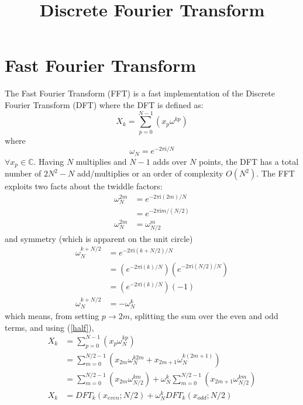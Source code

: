 \documentclass{article}
\begin{document}
%
\title{Discrete Fourier Transform}
%
\maketitle
%
\section {Fast Fourier Transform}
%
The Fast Fourier Transform (FFT) is a fast implementation of the Discrete Fourier Transform (DFT) where the DFT is defined as:
%
\begin {equation} \label {eq:dft}
X_k = \sum_{p = 0}^{N-1} (x_p \omega^{k p})
\end {equation}
%
where
%
\begin {equation} \label {eq:twiddle}
\omega_N = e^{-2 \pi \mathrm {i} / N}
\end {equation}
%
$\forall x_p \in \mathbb {C}$. Having $N$ multiplies and $N-1$ adds over $N$ points, the DFT has a total number of $2 N^2 - N$ add/multiplies or an order of complexity $O(N^2)$. The FFT exploits two facts about the twiddle factors:
%
\begin {equation} \label {half}
\begin {aligned}
\omega_N^{2m} &= e^{-2 \pi \mathrm {i} (2m) / N}    \\
              &= e^{-2 \pi \mathrm {i} m / (N / 2)} \\
\omega_N^{2m} &= \omega_{N/2}^m
\end {aligned}
\end {equation}
%
and symmetry (which is apparent on the unit circle)
%
\begin {equation} \label {symmetry}
\begin {aligned}
\omega_N^{k + N/2} &= e^{-2 \pi \mathrm {i} (k + N/2) / N} \\
             &= \left (e^{-2 \pi \mathrm {i} (k) / N} \right) \left (e^{-2 \pi \mathrm {i} (N/2) / N} \right) \\
             &= \left (e^{-2 \pi \mathrm {i} (k) / N} \right) \left (-1 \right) \\
\omega_N^{k + N/2} &= -\omega_{N}^{k}
\end {aligned}
\end {equation}
%
which means, from setting $p \rightarrow 2m$, splitting the sum over the even and odd terms, and using (\ref{half}),
%
\begin {equation} \label {eq:xk}
\begin {aligned}
X_k &= \sum_{p = 0}^{N-1} (x_p \omega_N^{k p}) \\
    &= \sum_{m = 0}^{N/2-1} (x_{2m} \omega_N^{k 2 m} + x_{2m+1} \omega_N^{k (2 m + 1)}) \\
    &= \sum_{m = 0}^{N/2-1} (x_{2m} \omega_{N/2}^{k m}) + \omega_N^{k} \sum_{m = 0}^{N/2-1} (x_{2m+1} \omega_{N/2}^{km}) \\
X_k &= DFT_k(x_{even}; N/2) + \omega_N^{k} DFT_k(x_{odd}; N/2)
\end {aligned}
\end {equation}
\end{document}
